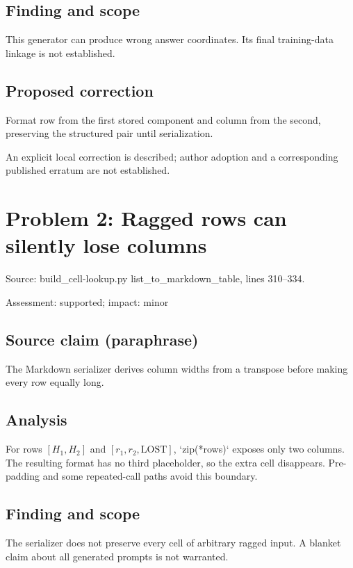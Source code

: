 \documentclass[11pt]{article}
\begin{document}
\subsection*{Finding and scope}

This generator can produce wrong answer coordinates. Its final training-data linkage is not established.

\subsection*{Proposed correction}

Format row from the first stored component and column from the second, preserving the structured pair until serialization.

An explicit local correction is described; author adoption and a corresponding published erratum are not established.

\section*{Problem 2: Ragged rows can silently lose columns}

Source: build\_cell-lookup.py list\_to\_markdown\_table, lines 310–334.

Assessment: supported; impact: minor

\subsection*{Source claim (paraphrase)}

The Markdown serializer derives column widths from a transpose before making every row equally long.

\subsection*{Analysis}

For rows \([H_1,H_2]\) and \([r_1,r_2,\mathrm{LOST}]\), `zip(*rows)` exposes only two columns. The resulting format has no third placeholder, so the extra cell disappears. Pre-padding and some repeated-call paths avoid this boundary.

\subsection*{Finding and scope}

The serializer does not preserve every cell of arbitrary ragged input. A blanket claim about all generated prompts is not warranted.
\end{document}
